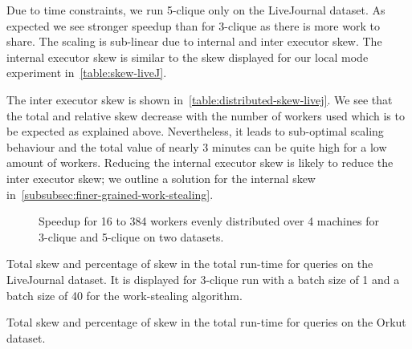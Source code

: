 Due to time constraints, we run 5-clique only on the LiveJournal dataset.
As expected we see stronger speedup than for 3-clique as there is more work to share.
The scaling is sub-linear due to internal and inter executor skew.
The internal executor skew is similar to the skew displayed for our local mode experiment in~\cref{table:skew-liveJ}.

The inter executor skew is shown in~\cref{table:distributed-skew-livej}.
We see that the total and relative skew decrease with the number of workers used which is to be
expected as explained above.
Nevertheless, it leads to sub-optimal scaling behaviour and the total value of nearly 3 minutes
can be quite high for a low amount of workers.
Reducing the internal executor skew is likely to reduce the inter executor skew;
we outline a solution for the internal skew in~\cref{subsubsec:finer-grained-work-stealing}.

\begin{figure}
    \subfloat[LiveJournal]{}
    \subfloat[Orkut]{}
    \caption{Speedup for 16 to 384 workers evenly distributed over 4 machines for
    3-clique and 5-clique on two datasets.
    }
    \label{fig:distributed-scaling}
\end{figure}

\begin{table}
    \centering
    \resizebox{\textwidth}{!}{%
    
    }
    \caption{Total skew and percentage of skew in the total run-time for queries on the LiveJournal dataset.
    It is displayed for 3-clique run with a batch size of 1 and a batch size of 40 for the work-stealing
    algorithm.
    }
    \label{table:distributed-skew-livej}
\end{table}

\begin{table}
    \centering
    \resizebox{\textwidth}{!}{%
    
    }
    \caption{Total skew and percentage of skew in the total run-time for queries on the Orkut dataset.
    }

    \label{table:distributed-skew-orkut}
\end{table}



